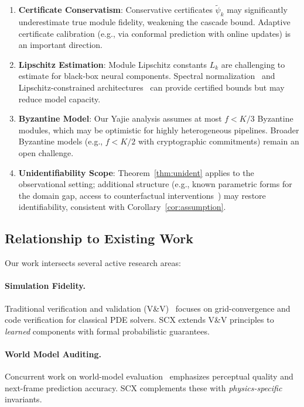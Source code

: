 \documentclass[11pt,twocolumn]{article}
\theoremstyle{definition}
\begin{document}
\begin{enumerate}[leftmargin=*,nosep]
  \item \textbf{Certificate Conservatism}: Conservative certificates
    $\tilde{\psi}_k$ may significantly underestimate true module fidelity,
    weakening the cascade bound.  Adaptive certificate calibration
    (e.g., via conformal prediction with online updates) is an important
    direction.
  \item \textbf{Lipschitz Estimation}: Module Lipschitz constants $L_k$ are
    challenging to estimate for black-box neural components.  Spectral
    normalization~\cite{miyato2018spectral} and Lipschitz-constrained
    architectures~\cite{trockman2025mim} can provide certified bounds but may
    reduce model capacity.
  \item \textbf{Byzantine Model}: Our Yajie analysis assumes at most $f < K/3$
    Byzantine modules, which may be optimistic for highly heterogeneous
    pipelines.  Broader Byzantine models (e.g., $f < K/2$ with cryptographic
    commitments) remain an open challenge.
  \item \textbf{Unidentifiability Scope}: Theorem~\ref{thm:unident} applies to
    the observational setting; additional structure (e.g., known parametric
    forms for the domain gap, access to counterfactual
    interventions~\cite{pearl2009causality}) may restore identifiability,
    consistent with Corollary~\ref{cor:assumption}.
\end{enumerate}

\subsection{Relationship to Existing Work}

Our work intersects several active research areas:

\paragraph{Simulation Fidelity.}
Traditional verification and validation (V\&V)~\cite{oberkampf2010verification}
focuses on grid-convergence and code verification for classical PDE solvers.
SCX extends V\&V principles to \emph{learned} components with formal
probabilistic guarantees.

\paragraph{World Model Auditing.}
Concurrent work on world-model evaluation~\cite{hu2024eval,michel2025genie}
emphasizes perceptual quality and next-frame prediction accuracy.  SCX
complements these with \emph{physics-specific} invariants.
\end{document}
